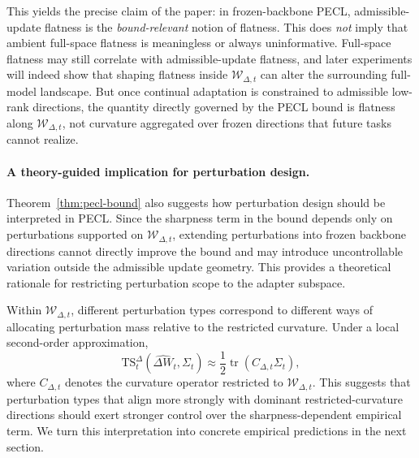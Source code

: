 \documentclass[10pt]{article} %
\begin{document}
This yields the precise claim of the paper:
in frozen-backbone PECL, admissible-update flatness is the \emph{bound-relevant} notion of flatness.
This does \emph{not} imply that ambient full-space flatness is meaningless or always uninformative.
Full-space flatness may still correlate with admissible-update flatness, and later experiments will indeed show that shaping flatness inside $\mathcal{W}_{\Delta,t}$ can alter the surrounding full-model landscape.
But once continual adaptation is constrained to admissible low-rank directions, the quantity directly governed by the PECL bound is flatness along $\mathcal{W}_{\Delta,t}$, not curvature aggregated over frozen directions that future tasks cannot realize.

\paragraph{A theory-guided implication for perturbation design.}
Theorem~\ref{thm:pecl-bound} also suggests how perturbation design should be interpreted in PECL.
Since the sharpness term in the bound depends only on perturbations supported on $\mathcal{W}_{\Delta,t}$, extending perturbations into frozen backbone directions cannot directly improve the bound and may introduce uncontrollable variation outside the admissible update geometry.
This provides a theoretical rationale for restricting perturbation scope to the adapter subspace.

Within $\mathcal{W}_{\Delta,t}$, different perturbation types correspond to different ways of allocating perturbation mass relative to the restricted curvature.
Under a local second-order approximation,
\[
\mathrm{TS}_t^\Delta(\widehat{\Delta W}_t,\Sigma_t)
\approx
\frac{1}{2}\operatorname{tr}(C_{\Delta,t}\Sigma_t),
\]
where $C_{\Delta,t}$ denotes the curvature operator restricted to $\mathcal{W}_{\Delta,t}$.
This suggests that perturbation types that align more strongly with dominant restricted-curvature directions should exert stronger control over the sharpness-dependent empirical term.
We turn this interpretation into concrete empirical predictions in the next section.



\end{document}
